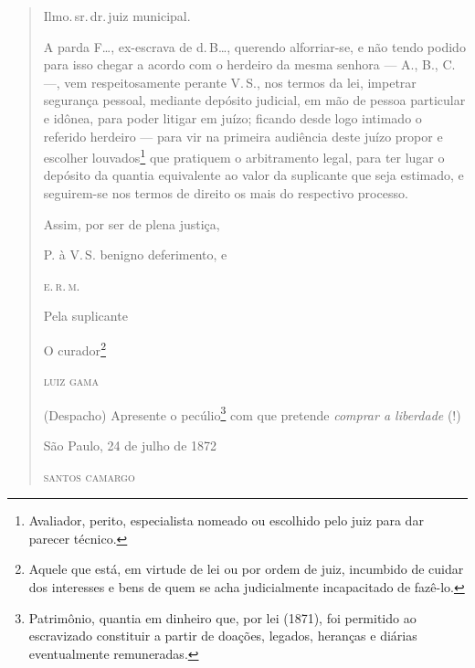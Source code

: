 \begin{quote}
Ilmo.\,sr.\,dr.\,juiz municipal.

A parda F\ldots{}, ex-escrava de d.\,B\ldots{}, querendo alforriar-se, e não tendo
podido para isso chegar a acordo com o herdeiro da mesma senhora --- A.,
B., C. ---, vem respeitosamente perante V.\,S., nos termos da lei,
impetrar segurança pessoal, mediante depósito judicial, em mão de pessoa
particular e idônea, para poder litigar em juízo; ficando desde logo
intimado o referido herdeiro --- para vir na primeira audiência deste
juízo propor e escolher louvados\footnote{ Avaliador, perito,
  especialista nomeado ou escolhido pelo juiz para dar parecer técnico.}
que pratiquem o arbitramento legal, para ter lugar o depósito da quantia
equivalente ao valor da suplicante que seja estimado, e seguirem-se nos
termos de direito os mais do respectivo processo.

\begin{flushright}
Assim, por ser de plena justiça,

P. à V.\,S. benigno deferimento, e

\textsc{e.\,r.\,m.}

Pela suplicante

O curador\footnote{ Aquele que está, em virtude de lei ou por ordem de
  juiz, incumbido de cuidar dos interesses e bens de quem se acha
  judicialmente incapacitado de fazê-lo.}

\textsc{luiz gama}
\end{flushright}

(Despacho) Apresente o pecúlio\footnote{ Patrimônio, quantia em
  dinheiro que, por lei (1871), foi permitido ao escravizado constituir
  a partir de doações, legados, heranças e diárias eventualmente
  remuneradas.} com que pretende \emph{comprar a liberdade} (!)

\begin{flushright}
São Paulo, 24 de julho de 1872

\textsc{santos camargo}
\end{flushright}
\end{quote}

